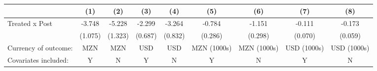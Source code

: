 \begin{tabular}[t]{lcccccccc}
\toprule
  & (1) & (2) & (3) & (4) & (5) & (6) & (7) & (8)\\
\midrule
Treated x Post & -3.748 & -5.228 & -2.299 & -3.264 & -0.784 & -1.151 & -0.111 & -0.173\\
 & (1.075) & (1.323) & (0.687) & (0.832) & (0.286) & (0.298) & (0.070) & (0.059)\\
Currency of outcome: & MZN & MZN & USD & USD & MZN (1000s) & MZN (1000s) & USD (1000s) & USD (1000s)\\
Covariates included: & Y & N & Y & N & Y & N & Y & N\\
\bottomrule
\end{tabular}
